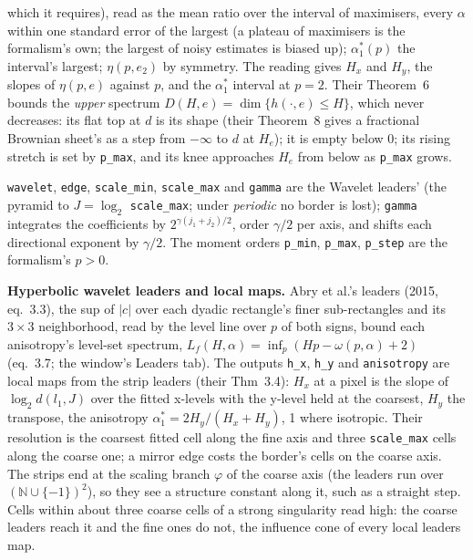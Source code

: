 \documentclass[10pt]{article}
\begin{document}
which it requires), read as the mean ratio over the interval of maximisers, every $\alpha$ within one
standard error of the largest (a plateau of maximisers is the formalism's own; the largest of noisy
estimates is biased up); $\alpha_1^*(p)$ the interval's largest; $\eta(p, e_2)$ by symmetry. The reading
gives $H_x$ and $H_y$, the slopes of $\eta(p, e)$ against $p$, and the $\alpha_1^*$ interval at $p = 2$.
Their Theorem~6 bounds the \emph{upper} spectrum $D(H, e) = \dim\{h(\cdot, e) \le H\}$, which never
decreases: its flat top at $d$ is its shape (their Theorem~8 gives a fractional Brownian sheet's as a step
from $-\infty$ to $d$ at $H_e$); it is empty below 0; its rising stretch is set by \texttt{p\_max}, and its
knee approaches $H_e$ from below as \texttt{p\_max} grows.

\texttt{wavelet}, \texttt{edge}, \texttt{scale\_min}, \texttt{scale\_max} and \texttt{gamma} are the Wavelet
leaders' (the pyramid to $J = \log_2$ \texttt{scale\_max}; under \emph{periodic} no border is lost);
\texttt{gamma} integrates the coefficients by $2^{\gamma(j_1+j_2)/2}$, order $\gamma/2$ per axis, and shifts
each directional exponent by $\gamma/2$. The moment orders \texttt{p\_min}, \texttt{p\_max},
\texttt{p\_step} are the formalism's $p > 0$.

\textbf{Hyperbolic wavelet leaders and local maps.} Abry et al.'s leaders (2015, eq.~3.3), the sup of $|c|$
over each dyadic rectangle's finer sub-rectangles and its $3\times3$ neighborhood, read by the level line
over $p$ of both signs, bound each anisotropy's level-set spectrum, $L_f(H, \alpha) = \inf_p (Hp -
\omega(p, \alpha) + 2)$ (eq.~3.7; the window's Leaders tab). The outputs \texttt{h\_x}, \texttt{h\_y} and
\texttt{anisotropy} are local maps from the strip leaders (their Thm~3.4): $H_x$ at a pixel is the slope of
$\log_2 d(l_1, J)$ over the fitted x-levels with the y-level held at the coarsest, $H_y$ the transpose,
the anisotropy $\alpha_1^* = 2H_y/(H_x + H_y)$, 1 where isotropic. Their resolution is the coarsest fitted
cell along the fine axis and three \texttt{scale\_max} cells along the coarse one; a mirror edge costs
the border's cells on the coarse axis. The strips end at the scaling branch $\varphi$ of the coarse axis (the
leaders run over $(\mathbb{N}\cup\{-1\})^2$), so they see a structure constant along it, such as a straight
step. Cells within about three coarse cells of a strong singularity read high: the coarse leaders reach it
and the fine ones do not, the influence cone of every local leaders map.
\end{document}
